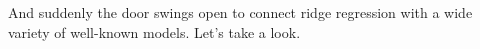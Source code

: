 \documentclass[11pt]{article}
\begin{document}
	And suddenly the door swings open to connect ridge regression with a wide variety of well-known models. Let's take a look.
	
%	
%	
%
	
	
	
\end{document}
